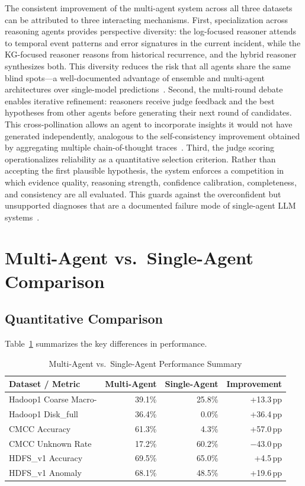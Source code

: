 The consistent improvement of the multi-agent system across all three datasets can be attributed
to three interacting mechanisms. First, specialization across reasoning agents provides
perspective diversity: the log-focused reasoner attends to temporal event patterns and error
signatures in the current incident, while the KG-focused reasoner reasons from historical
recurrence, and the hybrid reasoner synthesizes both. This diversity reduces the risk that all
agents share the same blind spots---a well-documented advantage of ensemble and multi-agent
architectures over single-model predictions~\cite{du2023improvingfactualityreasoninglanguage,wu2023autogen}.
Second, the multi-round debate enables iterative refinement: reasoners receive judge feedback and
the best hypotheses from other agents before generating their next round of candidates. This
cross-pollination allows an agent to incorporate insights it would not have generated
independently, analogous to the self-consistency improvement obtained by aggregating multiple
chain-of-thought traces~\cite{wang2023selfconsistencyimproveschainthought,wei2023chainofthoughtpromptingelicitsreasoning}.
Third, the judge scoring operationalizes reliability as a quantitative selection criterion. Rather
than accepting the first plausible hypothesis, the system enforces a competition in which evidence
quality, reasoning strength, confidence calibration, completeness, and consistency are all
evaluated. This guards against the overconfident but unsupported diagnoses that are a documented
failure mode of single-agent LLM systems~\cite{chen2024rcacopilot}.

\section{Multi-Agent vs.\ Single-Agent Comparison}

\subsection{Quantitative Comparison}
Table~\ref{tab:ma-vs-sa} summarizes the key differences in performance.

\begin{table}[H]
\centering
\caption{Multi-Agent vs.\ Single-Agent Performance Summary}
\label{tab:ma-vs-sa}
\begin{tabular}{lrrr}
\toprule
\textbf{Dataset / Metric} & \textbf{Multi-Agent} & \textbf{Single-Agent} & \textbf{Improvement} \\
\midrule
Hadoop1 Coarse Macro-\fone{} & 39.1\% & 25.8\% & +13.3\,pp \\
Hadoop1 Disk\_full \fone{}   & 36.4\% & 0.0\%  & +36.4\,pp \\
CMCC Accuracy                & 61.3\% & 4.3\%  & +57.0\,pp \\
CMCC Unknown Rate            & 17.2\% & 60.2\% & $-$43.0\,pp \\
HDFS\_v1 Accuracy            & 69.5\% & 65.0\% & +4.5\,pp  \\
HDFS\_v1 Anomaly \fone{}     & 68.1\% & 48.5\% & +19.6\,pp \\
\bottomrule
\end{tabular}
\end{table}

